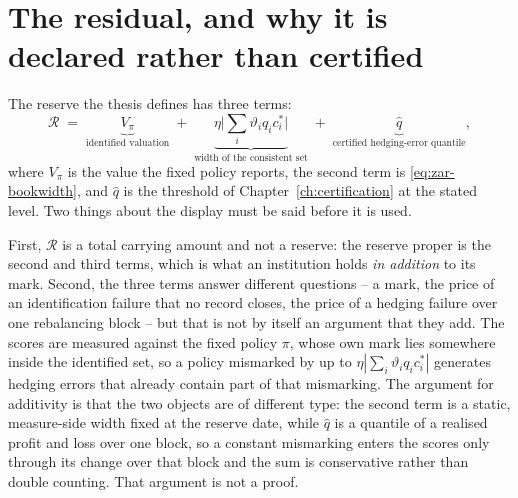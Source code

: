 \documentclass[../../../main.tex]{subfiles}
\begin{document}
\section{The residual, and why it is declared rather than certified}\label{sec:zar-residual}

The reserve the thesis defines has three terms:
\begin{equation}\label{eq:zar-reserve}
\mathcal R\;=\;\underbrace{V_\pi}_{\text{identified valuation}}\;+\;\underbrace{\eta\Big|\sum_i\vartheta_iq_ic^*_i\Big|}_{\text{width of the consistent set}}\;+\;\underbrace{\hat q}_{\text{certified hedging-error quantile}} ,
\end{equation}
where $V_\pi$ is the value the fixed policy reports, the second term is \eqref{eq:zar-bookwidth}, and $\hat q$ is the threshold of Chapter~\ref{ch:certification} at the stated level. Two things about the display must be said before it is used.

First, $\mathcal R$ is a total carrying amount and not a reserve: the reserve proper is the second and third terms, which is what an institution holds \emph{in addition} to its mark. Second, the three terms answer different questions -- a mark, the price of an identification failure that no record closes, the price of a hedging failure over one rebalancing block -- but that is not by itself an argument that they add. The scores are measured against the fixed policy $\pi$, whose own mark lies somewhere inside the identified set, so a policy mismarked by up to $\eta|\sum_i\vartheta_iq_ic^*_i|$ generates hedging errors that already contain part of that mismarking. The argument for additivity is that the two objects are of different type: the second term is a static, measure-side width fixed at the reserve date, while $\hat q$ is a quantile of a realised profit and loss over one block, so a constant mismarking enters the scores only through its change over that block and the sum is conservative rather than double counting. That argument is not a proof.

\end{document}
